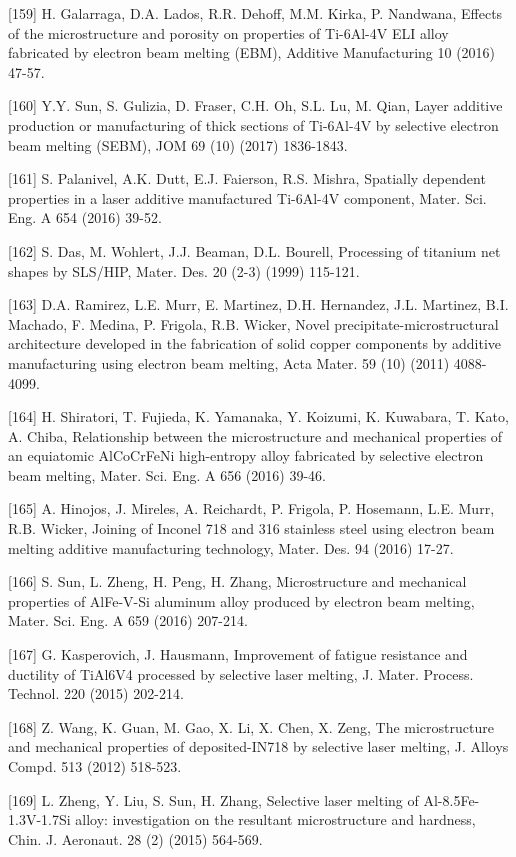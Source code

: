 \documentclass[10pt]{article}
\begin{document}
[159] H. Galarraga, D.A. Lados, R.R. Dehoff, M.M. Kirka, P. Nandwana, Effects of the microstructure and porosity on properties of Ti-6Al-4V ELI alloy fabricated by electron beam melting (EBM), Additive Manufacturing 10 (2016) 47-57.

[160] Y.Y. Sun, S. Gulizia, D. Fraser, C.H. Oh, S.L. Lu, M. Qian, Layer additive production or manufacturing of thick sections of Ti-6Al-4V by selective electron beam melting (SEBM), JOM 69 (10) (2017) 1836-1843.

[161] S. Palanivel, A.K. Dutt, E.J. Faierson, R.S. Mishra, Spatially dependent properties in a laser additive manufactured Ti-6Al-4V component, Mater. Sci. Eng. A 654 (2016) 39-52.

[162] S. Das, M. Wohlert, J.J. Beaman, D.L. Bourell, Processing of titanium net shapes by SLS/HIP, Mater. Des. 20 (2-3) (1999) 115-121.

[163] D.A. Ramirez, L.E. Murr, E. Martinez, D.H. Hernandez, J.L. Martinez, B.I. Machado, F. Medina, P. Frigola, R.B. Wicker, Novel precipitate-microstructural architecture developed in the fabrication of solid copper components by additive manufacturing using electron beam melting, Acta Mater. 59 (10) (2011) 4088-4099.

[164] H. Shiratori, T. Fujieda, K. Yamanaka, Y. Koizumi, K. Kuwabara, T. Kato, A. Chiba, Relationship between the microstructure and mechanical properties of an equiatomic AlCoCrFeNi high-entropy alloy fabricated by selective electron beam melting, Mater. Sci. Eng. A 656 (2016) 39-46.

[165] A. Hinojos, J. Mireles, A. Reichardt, P. Frigola, P. Hosemann, L.E. Murr, R.B. Wicker, Joining of Inconel 718 and 316 stainless steel using electron beam melting additive manufacturing technology, Mater. Des. 94 (2016) 17-27.

[166] S. Sun, L. Zheng, H. Peng, H. Zhang, Microstructure and mechanical properties of AlFe-V-Si aluminum alloy produced by electron beam melting, Mater. Sci. Eng. A 659 (2016) 207-214.

[167] G. Kasperovich, J. Hausmann, Improvement of fatigue resistance and ductility of TiAl6V4 processed by selective laser melting, J. Mater. Process. Technol. 220 (2015) 202-214.

[168] Z. Wang, K. Guan, M. Gao, X. Li, X. Chen, X. Zeng, The microstructure and mechanical properties of deposited-IN718 by selective laser melting, J. Alloys Compd. 513 (2012) 518-523.

[169] L. Zheng, Y. Liu, S. Sun, H. Zhang, Selective laser melting of Al-8.5Fe-1.3V-1.7Si alloy: investigation on the resultant microstructure and hardness, Chin. J. Aeronaut. 28 (2) (2015) 564-569.
\end{document}
